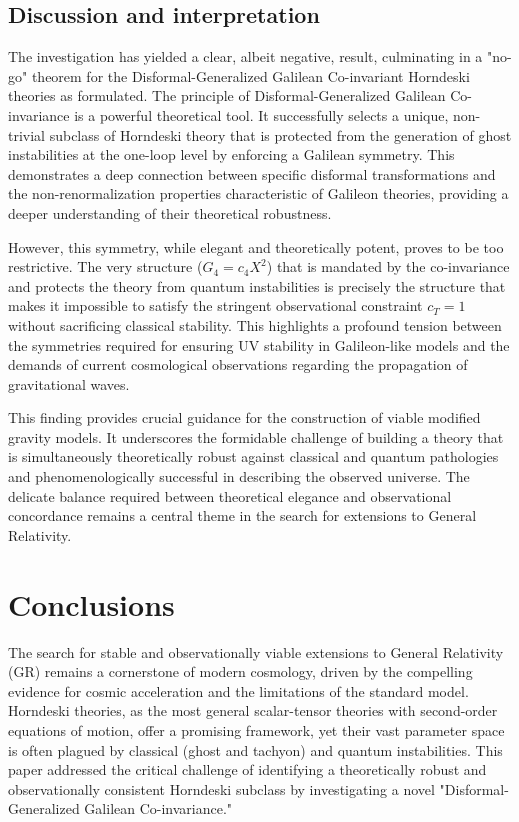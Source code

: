 \documentclass[twocolumn]{aastex631}
\begin{document}
\subsection{Discussion and interpretation}
The investigation has yielded a clear, albeit negative, result, culminating in a "no-go" theorem for the Disformal-Generalized Galilean Co-invariant Horndeski theories as formulated. The principle of Disformal-Generalized Galilean Co-invariance is a powerful theoretical tool. It successfully selects a unique, non-trivial subclass of Horndeski theory that is protected from the generation of ghost instabilities at the one-loop level by enforcing a Galilean symmetry. This demonstrates a deep connection between specific disformal transformations and the non-renormalization properties characteristic of Galileon theories, providing a deeper understanding of their theoretical robustness.

However, this symmetry, while elegant and theoretically potent, proves to be too restrictive. The very structure ($G_4 = c_4 X^2$) that is mandated by the co-invariance and protects the theory from quantum instabilities is precisely the structure that makes it impossible to satisfy the stringent observational constraint $c_T = 1$ without sacrificing classical stability. This highlights a profound tension between the symmetries required for ensuring UV stability in Galileon-like models and the demands of current cosmological observations regarding the propagation of gravitational waves.

This finding provides crucial guidance for the construction of viable modified gravity models. It underscores the formidable challenge of building a theory that is simultaneously theoretically robust against classical and quantum pathologies and phenomenologically successful in describing the observed universe. The delicate balance required between theoretical elegance and observational concordance remains a central theme in the search for extensions to General Relativity.

\section{Conclusions}
\label{sec:conclusions}
The search for stable and observationally viable extensions to General Relativity (GR) remains a cornerstone of modern cosmology, driven by the compelling evidence for cosmic acceleration and the limitations of the standard model. Horndeski theories, as the most general scalar-tensor theories with second-order equations of motion, offer a promising framework, yet their vast parameter space is often plagued by classical (ghost and tachyon) and quantum instabilities. This paper addressed the critical challenge of identifying a theoretically robust and observationally consistent Horndeski subclass by investigating a novel "Disformal-Generalized Galilean Co-invariance."
\end{document}

